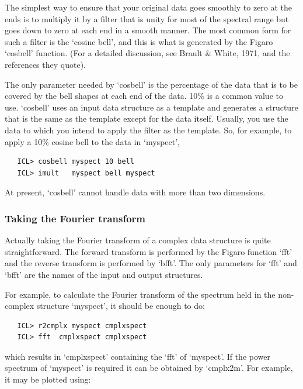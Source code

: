    The simplest way to ensure that your original data goes smoothly
   to zero at the ends is to multiply it by a filter that is unity for
   most of the spectral range but goes down to zero at each end in a
   smooth manner.  The most common form for such a filter is the `cosine
   bell', and this is what is generated by the Figaro `cosbell'
   function.  (For a detailed discussion, see Brault \& White, 1971,
   and the references they quote).

   The only parameter needed by `cosbell' is the percentage of the data
   that is to be covered by the bell shapes at each end of the data.
   10\% is a common value to use.  `cosbell' uses an input data structure
   as a template and generates a structure that is the same as the
   template except for the data itself.  Usually, you use the data to
   which you intend to apply the filter as the template.  So, for
   example, to apply a 10\% cosine bell to the data in `myspect',

\begin{verbatim}
   ICL> cosbell myspect 10 bell
   ICL> imult   myspect bell myspect
\end{verbatim}

   At present, `cosbell' cannot handle data with more than two dimensions.


\subsubsection{\label{techno6dofft}Taking the Fourier transform}

   Actually taking the Fourier transform of a complex data structure is
   quite straightforward.  The forward transform is performed by the
   Figaro function `fft' and the reverse transform is performed by
   `bfft'.  The only parameters for `fft' and `bfft' are the names of
   the input and output structures.

   For example, to calculate the Fourier transform of the spectrum
   held in the non-complex structure `myspect', it should be enough to
   do:

\begin{verbatim}
   ICL> r2cmplx myspect cmplxspect
   ICL> fft  cmplxspect cmplxspect
\end{verbatim}

   which results in `cmplxspect' containing the `fft' of `myspect'.  If the
   power spectrum of `myspect' is required it can be obtained by
   `cmplx2m'. For example, it may be plotted using:

